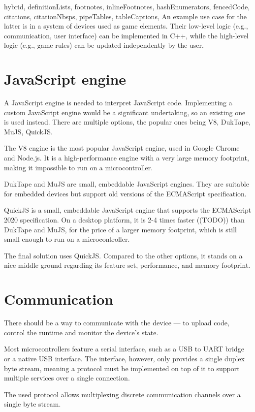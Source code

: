 \documentclass[
  digital,
  oneside,
  nosansbold,
  nocolorbold,
  lof,
  lot
]{fithesis4}
\begin{document}
\begin{markdown*}{%
  hybrid,
  definitionLists,
  footnotes,
  inlineFootnotes,
  hashEnumerators,
  fencedCode,
  citations,
  citationNbsps,
  pipeTables,
  tableCaptions,
}
An example use case for the latter is in a system of devices used as game elements. Their low-level logic (e.g., communication, user interface) can be implemented in C++, while the high-level logic (e.g., game rules) can be updated independently by the user.

\section{JavaScript engine}

A JavaScript engine is needed to interpret JavaScript code. Implementing a custom JavaScript engine would be a significant undertaking, so an existing one is used instead. There are multiple options, the popular ones being V8, DukTape, MuJS, QuickJS.

The V8 engine is the most popular JavaScript engine, used in Google Chrome and Node.js. It is a high-performance engine with a very large memory footprint, making it impossible to run on a microcontroller.

DukTape and MuJS are small, embeddable JavaScript engines. They are suitable for embedded devices but support old versions of the ECMAScript specification.

QuickJS is a small, embeddable JavaScript engine that supports the ECMAScript 2020 specification. On a desktop platform, it is 2-4 times faster ((TODO)) than DukTape and MuJS, for the price of a larger memory footprint, which is still small enough to run on a microcontroller.

The final solution uses QuickJS. Compared to the other options, it stands on a nice middle ground regarding its feature set, performance, and memory footprint.

\section{Communication}

There should be a way to communicate with the device --- to upload code, control the runtime and monitor the device's state.

Most microcontrollers feature a serial interface, such as a USB to UART bridge or a native USB interface. The interface, however, only provides a single duplex byte stream, meaning a protocol must be implemented on top of it to support multiple services over a single connection.

The used protocol allows multiplexing discrete communication channels over a single byte stream.


\end{markdown*}
\end{document}
